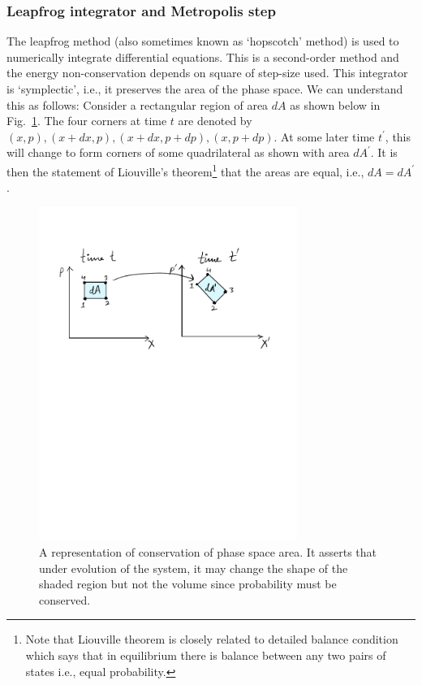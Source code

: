\documentclass[11pt]{article}
\begin{document}
\subsubsection{Leapfrog integrator and Metropolis step}
The leapfrog method (also sometimes known as `hopscotch' method) 
is used to numerically integrate differential equations. This is a second-order 
method and the energy non-conservation depends on square of step-size used. This integrator is `symplectic', i.e., it preserves the 
area of the phase space. We can understand this as follows: 
Consider a rectangular region of area $dA$ as shown below in Fig.~\ref{fig:PSP1}. The four corners at time $t$ are denoted by $(x, p), (x+dx, p), (x+dx, p+dp),(x, p+dp)$. At some later time $t^{\prime}$, this will change to form corners of some quadrilateral as shown with area $dA^{\prime}$. It is then the statement of Liouville's theorem\footnote{Note that Liouville theorem is closely related to detailed balance condition which says that in equilibrium there is balance between any two pairs of states i.e., equal probability.} that the areas are equal, i.e., $dA = dA^{\prime}$. 
\begin{figure}[htbp] 
	\centering 
	\includegraphics[width=0.75\textwidth]{figs/PSP.pdf}
	\caption{\label{fig:PSP1}A representation of conservation of phase space area. It asserts that under evolution of the system, it may change the shape of the shaded region but not the volume since probability must be conserved.}
\end{figure}
\end{document}
